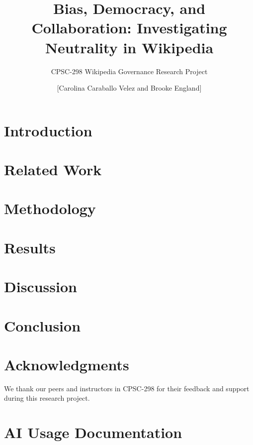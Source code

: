 \documentclass[sigconf,screen]{acmart}
\title{Bias, Democracy, and Collaboration: Investigating Neutrality in Wikipedia}
\subtitle{CPSC-298 Wikipedia Governance Research Project}
\author{[Carolina Caraballo Velez and Brooke England]}
\affiliation{%
  \institution{Chapman University}
  \city{Orange, CA}
  \country{USA}
}
\begin{document}
\maketitle

\section{Introduction}


\section{Related Work}


\section{Methodology}


\section{Results}


\section{Discussion}


\section{Conclusion}


\section*{Acknowledgments}
We thank our peers and instructors in CPSC-298 for their feedback and support during this research project.




\appendix
\section{AI Usage Documentation}

\end{document}
